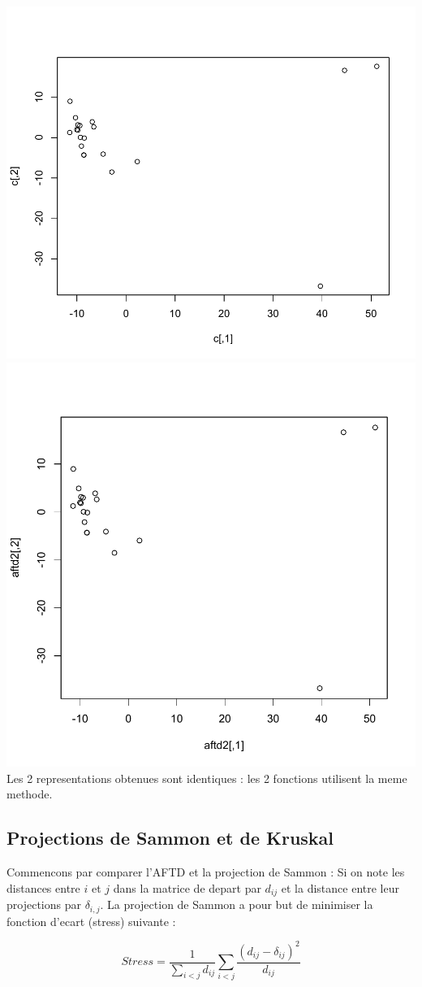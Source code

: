 \documentclass[a4paper,11pt]{article}
\begin{document}
\hspace{-1.8cm} \includegraphics[width=.6\textwidth]{Exo2/aftd1.pdf}
\includegraphics[width=.6\textwidth]{Exo2/cmdscale.pdf}\\

\noindent Les 2 representations obtenues sont identiques : les 2 fonctions utilisent la meme methode.\\

\subsection{Projections de Sammon et de Kruskal}

\noindent Commencons par comparer l'AFTD et la projection de Sammon : Si on note les distances entre $i$ et $j$ dans la matrice de depart par $d_{ij}$ et la distance entre leur projections par $\delta_{i,j}$. La projection de Sammon a pour but de minimiser la fonction d'ecart (stress) suivante :

\begin{equation}
Stress = \frac{1}{\sum\limits_{i<j} d_{ij}} \sum\limits_{i<j} \frac{ ( d_{ij} - \delta_{ij} )^2 }{d_{ij}}
\end{equation}
\end{document}
